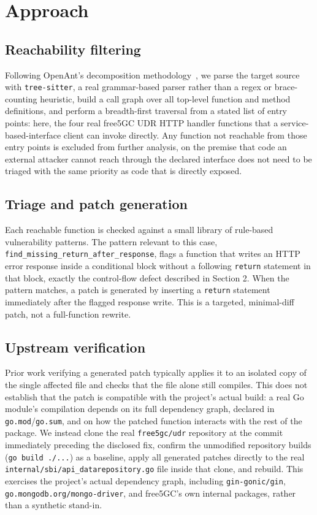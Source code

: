 \documentclass[sigconf]{acmart}
\begin{document}
\section{Approach}

\subsection{Reachability filtering}

Following OpenAnt's decomposition methodology~\cite{openant}, we parse
the target source with \texttt{tree-sitter}, a real grammar-based
parser rather than a regex or brace-counting heuristic, build a call
graph over all top-level function and method definitions, and perform
a breadth-first traversal from a stated list of entry points: here,
the four real free5GC UDR HTTP handler functions that a
service-based-interface client can invoke directly.
Any function not reachable from those entry points is excluded from
further analysis, on the premise that code an external attacker cannot
reach through the declared interface does not need to be triaged with
the same priority as code that is directly exposed.

\subsection{Triage and patch generation}

Each reachable function is checked against a small library of
rule-based vulnerability patterns. The pattern relevant to this case,
\texttt{find\_missing\_return\_after\_response}, flags a function that
writes an HTTP error response inside a conditional block without a
following \texttt{return} statement in that block, exactly the
control-flow defect described in Section 2. When the pattern matches,
a patch is generated by inserting a \texttt{return} statement
immediately after the flagged response write. This is a targeted,
minimal-diff patch, not a full-function rewrite.

\subsection{Upstream verification}

Prior work verifying a generated patch typically applies it to an
isolated copy of the single affected file and checks that the file
alone still compiles. This does not establish that the patch is
compatible with the project's actual build: a real Go module's
compilation depends on its full dependency graph, declared in
\texttt{go.mod}/\texttt{go.sum}, and on how the patched function
interacts with the rest of the package. We instead clone the real
\texttt{free5gc/udr} repository at the commit immediately preceding the
disclosed fix, confirm the unmodified repository builds
(\texttt{go build ./...}) as a baseline, apply all generated patches
directly to the real \texttt{internal/sbi/api\_datarepository.go} file
inside that clone, and rebuild. This exercises the project's actual
dependency graph, including \texttt{gin-gonic/gin},
\texttt{go.mongodb.org/mongo-driver}, and free5GC's own internal
packages, rather than a synthetic stand-in.
\end{document}
